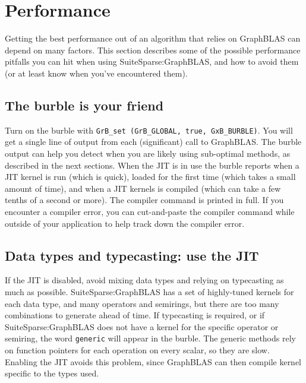 
\newpage
\section{Performance} %
\label{perf}

Getting the best performance out of an algorithm that relies on GraphBLAS can
depend on many factors.  This section describes some of the possible
performance pitfalls you can hit when using SuiteSparse:GraphBLAS, and how to
avoid them (or at least know when you've encountered them).

\subsection{The burble is your friend}

Turn on the burble with \verb'GrB_set (GrB_GLOBAL, true, GxB_BURBLE)'.  You will get a
single line of output from each (significant) call to GraphBLAS.
The burble output can help you detect when you are likely using sub-optimal
methods, as described in the next sections.
When the JIT is in use the burble reports when a JIT kernel is run (which
is quick), loaded for the first time (which takes a small amount of time),
and when a JIT kernels is compiled (which can take a few tenths of a second
or more).  The compiler command is printed in full.  If you encounter a
compiler error, you can cut-and-paste the compiler command while outside
of your application to help track down the compiler error.

\subsection{Data types and typecasting: use the JIT}

If the JIT is disabled,
avoid mixing data types and relying on typecasting as much as possible.
SuiteSparse:GraphBLAS has a set of highly-tuned kernels for each data type,
and many operators and semirings, but there are too many combinations to
generate ahead of time.  If typecasting is required, or if
SuiteSparse:GraphBLAS does not have a kernel for the specific operator or
semiring, the word \verb'generic' will appear in the burble.  The generic
methods rely on function pointers for each operation on every scalar, so they
are slow.  Enabling the JIT avoids this problem, since GraphBLAS can then
compile kernel specific to the types used.

